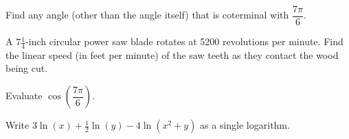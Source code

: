 \documentclass[addpoints]{exam}
\begin{document}
\begin{questions}
\pagebreak

\question[2]
Find any angle (other than the angle itself) that is coterminal with $\dfrac{7\pi}{6}$.
\vfill

\noindent\makebox[\linewidth]{\rule{\paperwidth}{0.4pt}}
\question[3] A $7\frac{1}{4}$-inch circular power saw blade rotates at 5200 revolutions per minute.  Find the linear speed (in feet per minute) of the saw teeth as they contact the wood being cut.
\vfill


\noindent\makebox[\linewidth]{\rule{\paperwidth}{0.4pt}}
\question [3]
Evaluate $\cos \left(\dfrac{7\pi}{6}\right)$.

\vfill

\noindent\makebox[\linewidth]{\rule{\paperwidth}{0.4pt}}
\question[5] Write $3\ln(x) + \frac{1}{2}\ln(y) -4\ln(x^2+y)$ as a single logarithm.
\vfill

\vfill
\pagebreak

\end{questions}
\end{document}
